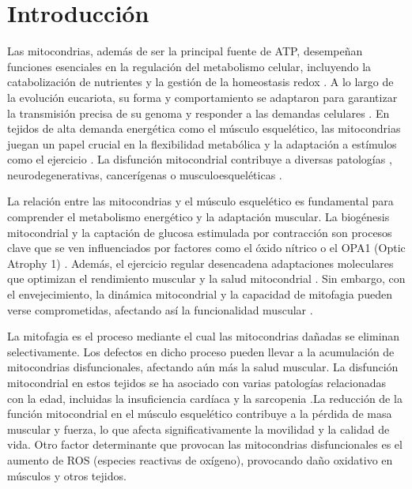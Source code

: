 
\section{Introducción}

Las mitocondrias, además de ser la principal fuente de ATP, desempeñan funciones esenciales en la regulación del metabolismo celular, incluyendo la catabolización de nutrientes y la gestión de la homeostasis redox \cite{Spinelli2018}. A lo largo de la evolución eucariota, su forma y comportamiento se adaptaron para garantizar la transmisión precisa de su genoma y responder a las demandas celulares \cite{Friedman2014}. En tejidos de alta demanda energética como el músculo esquelético, las mitocondrias juegan un papel crucial en la flexibilidad metabólica y la adaptación a estímulos como el ejercicio \cite{Memme2021, Smith2023}. La disfunción mitocondrial contribuye a diversas patologías \cite{QuintanaCabrera2023}, neurodegenerativas, cancerígenas \cite{Chan2020} o musculoesqueléticas \cite{Liu2017}.

La relación entre las mitocondrias y el músculo esquelético es fundamental para comprender el metabolismo energético y la adaptación muscular. La biogénesis mitocondrial y la captación de glucosa estimulada por contracción son procesos clave que se ven influenciados por factores como el óxido nítrico \cite{McConell2008} o el OPA1 (Optic Atrophy 1) \cite{Noone2022}. Además, el ejercicio regular desencadena adaptaciones moleculares que optimizan el rendimiento muscular y la salud mitocondrial \cite{Hargreaves2020,Egan2013}. Sin embargo, con el envejecimiento, la dinámica mitocondrial y la capacidad de mitofagia pueden verse comprometidas, afectando así la funcionalidad muscular \cite{Hood2019,Leudec}. 

La mitofagia es el proceso mediante el cual las mitocondrias dañadas se eliminan selectivamente. Los defectos en dicho proceso pueden llevar a la acumulación de mitocondrias disfuncionales, afectando aún más la salud muscular. \cite{Leudec} La disfunción mitocondrial \cite{chen} en estos tejidos se ha asociado con varias patologías relacionadas con la edad, incluidas la insuficiencia cardíaca y la sarcopenia \cite{Boengler} .La reducción de la función mitocondrial en el músculo esquelético contribuye a la pérdida de masa muscular y fuerza, lo que afecta significativamente la movilidad y la calidad de vida. Otro factor determinante que provocan las mitocondrias disfuncionales es el aumento de ROS (especies reactivas de oxígeno), provocando daño oxidativo en músculos y otros tejidos. \cite{java}


